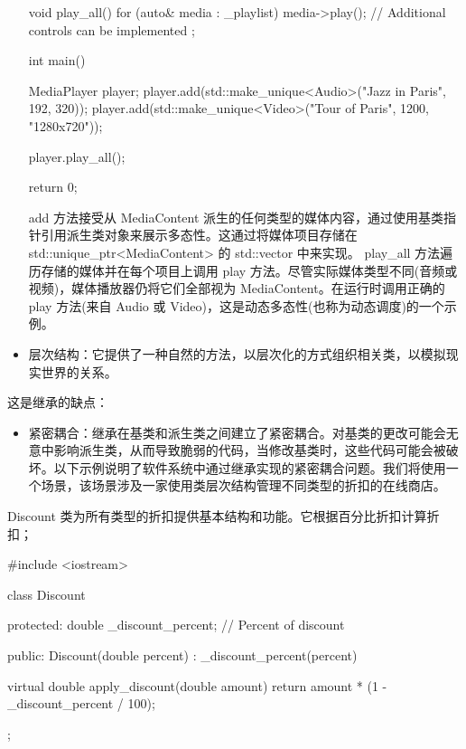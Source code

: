 \begin{itemize}
\begin{cpp}
{    void play_all() {
        for (auto& media : _playlist) {
            media->play();
            // Additional controls can be implemented
        }
    }
};

int main() {
    MediaPlayer player;
    player.add(std::make_unique<Audio>("Jazz in Paris", 192, 320));
    player.add(std::make_unique<Video>("Tour of Paris", 1200, "1280x720"));

    player.play_all();

    return 0;
}
\end{cpp}

add 方法接受从 MediaContent 派生的任何类型的媒体内容，通过使用基类指针引用派生类对象来展示多态性。这通过将媒体项目存储在 std::unique\_ptr<MediaContent> 的 std::vector 中来实现。 play\_all 方法遍历存储的媒体并在每个项目上调用 play 方法。尽管实际媒体类型不同(音频或视频)，媒体播放器仍将它们全部视为 MediaContent。在运行时调用正确的 play 方法(来自 Audio 或 Video)，这是动态多态性(也称为动态调度)的一个示例。

\item
层次结构：它提供了一种自然的方法，以层次化的方式组织相关类，以模拟现实世界的关系。
\end{itemize}

这是继承的缺点：

\begin{itemize}
\item
紧密耦合：继承在基类和派生类之间建立了紧密耦合。对基类的更改可能会无意中影响派生类，从而导致脆弱的代码，当修改基类时，这些代码可能会被破坏。以下示例说明了软件系统中通过继承实现的紧密耦合问题。我们将使用一个场景，该场景涉及一家使用类层次结构管理不同类型的折扣的在线商店。
\end{itemize}


Discount 类为所有类型的折扣提供基本结构和功能。它根据百分比折扣计算折扣；

\begin{cpp}
#include <iostream>

class Discount {
protected:
    double _discount_percent; // Percent of discount

public:
    Discount(double percent) : _discount_percent(percent) {}

    virtual double apply_discount(double amount) {
        return amount * (1 - _discount_percent / 100);
    }
};
\end{cpp}



